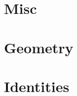 \documentclass[10pt, twocolumn]{article}
\begin{document}
\section{Misc}


\section{Geometry}







\section{Identities}

\end{document}
